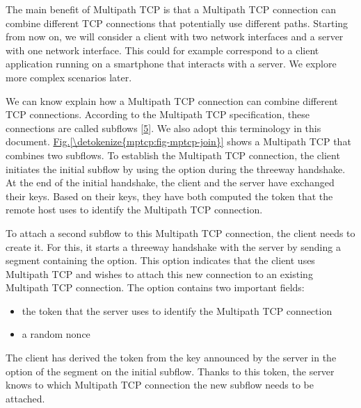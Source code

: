 \documentclass[letterpaper,10pt,english]{sphinxmanual}
\begin{document}
\sphinxAtStartPar
The main benefit of Multipath TCP is that a Multipath TCP connection can combine different TCP connections that potentially use different paths. Starting from now on, we will consider a client with two network interfaces and a server with one network interface. This could for example correspond to a client application running on a smartphone that interacts with a server. We explore more complex scenarios later.

\sphinxAtStartPar
We can know explain how a Multipath TCP connection can combine different TCP connections. According to the Multipath TCP specification, these connections are called subflows {[}\hyperlink{cite.biblio:id8500}{5}{]}. We also adopt this terminology in this document. \hyperref[\detokenize{mptcp:fig-mptcp-join}]{Fig.\@ \ref{\detokenize{mptcp:fig-mptcp-join}}} shows a Multipath TCP that combines two subflows. To establish the Multipath TCP connection, the client initiates the initial subflow by using the  option during the three\sphinxhyphen{}way handshake. At the end of the initial handshake, the client and the server have exchanged their keys. Based on their keys, they have both computed the token that the remote host uses to identify the Multipath TCP connection.

\sphinxAtStartPar
To attach a second subflow to this Multipath TCP connection, the client needs to create it. For this, it starts a three\sphinxhyphen{}way handshake with the server by sending a  segment containing the  option. This option indicates that the client uses Multipath TCP and wishes to attach this new connection to an existing Multipath TCP connection. The  option contains two important fields:
\begin{itemize}
\item {} 
\sphinxAtStartPar
the token that the server uses to identify the Multipath TCP connection

\item {} 
\sphinxAtStartPar
a random nonce

\end{itemize}

\sphinxAtStartPar
The client has derived the token from the key announced by the server in the  option of the  segment on the initial subflow. Thanks to this token, the server knows to which Multipath TCP connection the new subflow needs to be attached.
\end{document}
